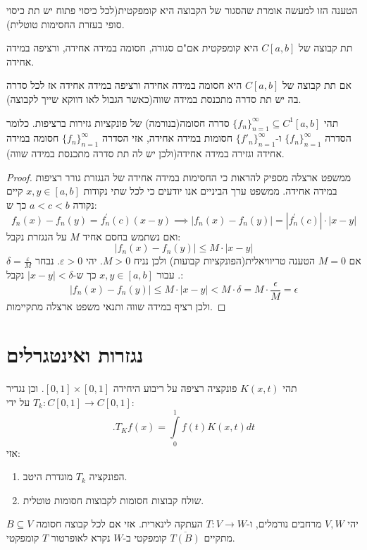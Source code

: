 \documentclass{tstextbook}
\begin{document}
\begin{remark}
הטענה הזו למעשה אומרת שהסגור של הקבוצה היא קומפקטית(לכל כיסוי פתוח יש תת כיסוי סופי בעזרת החסימות טוטלית).

\end{remark}
\begin{corollary}
תת קבוצה של \(C[a,b]\) היא קומפקטית אם"ם סגורה, חסומה במידה אחידה, ורציפה במידה אחידה.

\end{corollary}
\begin{corollary}
אם תת קבוצה של \(C[a,b]\) היא חסומה במידה אחידה ורציפה במידה אחידה אז לכל סדרה בה יש תת סדרה מתכנסת במידה שווה(כאשר הגבול לאו דווקא שייך לקבוצה).

\end{corollary}
\begin{theorem}
תהי \(\{ f_{n} \}_{n=1}^{\infty}\subseteq C^{1}[a,b]\) סדרה חסומה(בנורמה) של פונקציות גזירות ברציפות. כלומר הסדרה \(\{ f_{n} \}_{n=1}^{\infty}\) ו-\(\{ f'_{n} \}_{n=1}^{\infty}\) חסומות במידה אחידה, אזי הסדרה \(\{ f_{n} \}_{n=1}^{\infty}\) חסומה במידה אחידה וגזירה במידה אחידה(ולכן יש לה תת סדרה מתכנסת במידה שווה).

\end{theorem}
\begin{proof}
ממשפט ארצלה מספיק להראות כי החסימות במידה אחידה של הנגזרת גורר רציפות במידה אחידה.
ממשפט ערך הביניים אנו יודעים כי לכל שתי נקודות \(x,y \in [a,b]\) קיים נקודה \(a<c<b\) כך ש:
$$f_{n}(x)-f_{n}(y)=f_{n}^{\prime}(c)(x-y)\implies |f_{n}(x)-f_{n}(y)|=|f_{n}^{\prime}(c)|\cdot|x-y|$$
ואם נשתמש בחסם אחיד \(M\) על הנגזרת נקבל:
$$|f_{n}(x)-f_{n}(y)|\leq M\cdot|x-y|$$
אם \(M=0\) הטענה טריוויאלית(הפונקציות קבועות) ולכן נניח \(M> 0\). יהי \(\varepsilon> 0\). נבחר \(\delta=\frac{\varepsilon}{M}\). עבור \(x,y \in [a,b]\) כך ש-\(\lvert x-y \rvert<\delta\) נקבל:
$$|f_{n}(x)-f_{n}(y)|\leq M\cdot|x-y|<M\cdot\delta=M\cdot{\frac{\epsilon}{M}}=\epsilon$$
ולכן רציף במידה שווה ותנאי משפט ארצלה מתקיימות.

\end{proof}
\section{נגזרות ואינטגרלים}

\begin{proposition}
תהי \(K(x,t)\) פונקציה רציפה על ריבוע היחידה \([0,1]\times[0,1]\). וכן נגדיר \(T_{k}:C[0,1]\to C[0,1]\) על ידי:
$$.T_{K}f(x)=\!\!\int\limits_{0}^{1}f(t)K(x,t)d t$$
אזי:

  \begin{enumerate}
    \item הפונקציה \(T_{k}\) מוגדרת היטב. 


    \item שולח קבוצות חסומות לקבוצות חסומות טוטלית. 


  \end{enumerate}
\end{proposition}
\begin{definition}
יהי \(V,W\) מרחבים נורמלים, ו-\(T:V\to W\) העתקה לינארית. אזי אם לכל קבוצה חסומה \(B\subseteq V\) מתקיים \(\overline{T(B)}\) קומפקטי ב-\(W\) נקרא לאופרטור \(T\) קומפקטי.

\end{definition}
\end{document}

